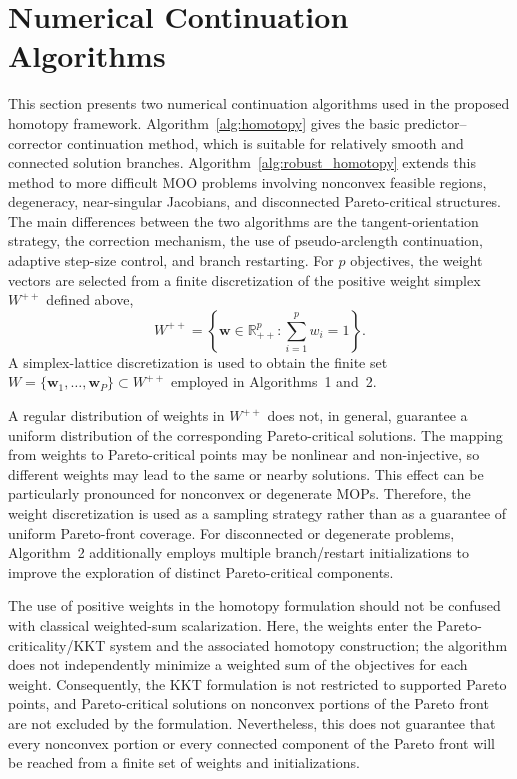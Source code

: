 \documentclass[11pt,pdflatex,sn-mathphys-ay]{sn-jnl}%
\theoremstyle{definition}
\theoremstyle{thmstyleone}%
\theoremstyle{thmstyletwo}%
\theoremstyle{thmstylethree}%
\newcommand{\add}[1]{\textcolor{revisionblue}{#1}}
\begin{document}
	\section{Numerical Continuation Algorithms}
	\label{sec:alg}
	
	This section presents two numerical continuation algorithms used in the proposed homotopy framework. 
	Algorithm~\ref{alg:homotopy} gives the basic predictor--corrector continuation method, which is suitable for relatively smooth and connected solution branches. Algorithm~\ref{alg:robust_homotopy} extends this method to more difficult MOO problems involving nonconvex feasible regions, degeneracy, near-singular Jacobians, and disconnected Pareto-critical structures. 
	The main differences between the two algorithms are the tangent-orientation strategy, the correction mechanism, the use of pseudo-arclength continuation, adaptive step-size control, and branch restarting.
	\add{For $p$ objectives, the weight vectors are selected from a finite
		discretization of the positive weight simplex $W^{++}$ defined above,
		\[
		W^{++}
		=
		\left\{
		\mathbf{w}\in\mathbb{R}_{++}^{p}:
		\sum_{i=1}^{p}w_i=1
		\right\}.
		\]
		A simplex-lattice discretization is used to obtain the finite set
		$W=\{\mathbf{w}_1,\ldots,\mathbf{w}_P\}\subset W^{++}$ employed in
		Algorithms~1 and~2.}
	
	\add{A regular distribution of weights in $W^{++}$ does not, in general,
		guarantee a uniform distribution of the corresponding Pareto-critical
		solutions. The mapping from weights to Pareto-critical points may be
		nonlinear and non-injective, so different weights may lead to the same
		or nearby solutions. This effect can be particularly pronounced for
		nonconvex or degenerate MOPs. Therefore, the weight discretization is
		used as a sampling strategy rather than as a guarantee of uniform
		Pareto-front coverage. For disconnected or degenerate problems,
		Algorithm~2 additionally employs multiple branch/restart initializations
		to improve the exploration of distinct Pareto-critical components.}
	
	\add{The use of positive weights in the homotopy formulation should not be
		confused with classical weighted-sum scalarization. Here, the weights
		enter the Pareto-criticality/KKT system and the associated homotopy
		construction; the algorithm does not independently minimize a weighted
		sum of the objectives for each weight. Consequently, the KKT formulation
		is not restricted to supported Pareto points, and Pareto-critical
		solutions on nonconvex portions of the Pareto front are not excluded by
		the formulation. Nevertheless, this does not guarantee that every
		nonconvex portion or every connected component of the Pareto front will
		be reached from a finite set of weights and initializations.}
	
\end{document}

